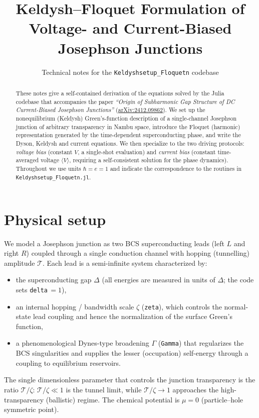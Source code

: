 \documentclass[11pt,a4paper]{article}
\title{\bf Keldysh--Floquet Formulation of Voltage- and
Current-Biased Josephson Junctions}
\author{Technical notes for the \texttt{Keldyshsetup\_Floquetn} codebase}
\date{}
\begin{document}
\maketitle

\begin{abstract}
These notes give a self-contained derivation of the equations solved by the
Julia codebase that accompanies the paper \emph{``Origin of Subharmonic Gap
Structure of DC Current-Biased Josephson Junctions''}
(\href{https://arxiv.org/abs/2412.09862}{arXiv:2412.09862}).  We set up the
nonequilibrium (Keldysh) Green's-function description of a single-channel
Josephson junction of arbitrary transparency in Nambu space, introduce the
Floquet (harmonic) representation generated by the time-dependent
superconducting phase, and write the Dyson, Keldysh and current equations.
We then specialize to the two driving protocols: \emph{voltage bias}
(constant $V$, a single-shot evaluation) and \emph{current bias} (constant
time-averaged voltage $\langle V\rangle$, requiring a self-consistent solution
for the phase dynamics).  Throughout we use units $\hbar=e=1$ and indicate the
correspondence to the routines in \texttt{Keldyshsetup\_Floquetn.jl}.
\end{abstract}

\tableofcontents

\section{Physical setup}
\label{sec:setup}

We model a Josephson junction as two BCS superconducting leads (left $L$ and
right $R$) coupled through a single conduction channel with hopping
(tunnelling) amplitude $\mathcal{T}$.  Each lead is a semi-infinite system
characterized by:
\begin{itemize}
  \item the superconducting gap $\Delta$ (all energies are measured in units of
        $\Delta$; the code sets \texttt{delta}\,$=1$),
  \item an internal hopping / bandwidth scale $\zeta$ (\texttt{zeta}), which
        controls the normal-state lead coupling and hence the normalization of
        the surface Green's function,
  \item a phenomenological Dynes-type broadening $\Gamma$ (\texttt{Gamma}) that
        regularizes the BCS singularities and supplies the lesser (occupation)
        self-energy through a coupling to equilibrium reservoirs.
\end{itemize}
The single dimensionless parameter that controls the junction transparency is
the ratio $\mathcal{T}/\zeta$: $\mathcal{T}/\zeta\ll 1$ is the tunnel limit,
while $\mathcal{T}/\zeta\to 1$ approaches the high-transparency (ballistic)
regime.  The chemical potential is $\mu=0$ (particle--hole symmetric point).
\end{document}
